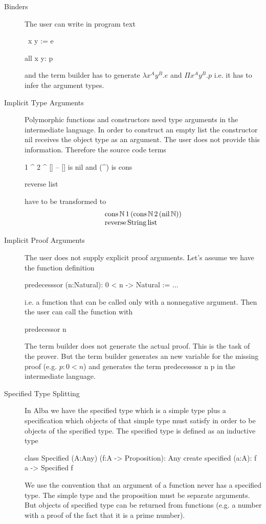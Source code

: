 \begin{description}

\item[Binders]
  The user can write in program text
  \begin{alba}
    \ x y := e

    all x y: p
  \end{alba}
  and the term builder has to generate $\lambda x^A y^B. e$ and $\Pi
  x^A y^B  . p$ i.e. it has to infer the argument types.


\item[Implicit Type Arguments]
  Polymorphic functions and constructors need type arguments in the
  intermediate language. In order to construct an empty list the constructor
  $\text{nil}$ receives the object type as an argument. The user does not
  provide this information. Therefore the source code terms
  \begin{alba}
    1 ^ 2 ^ []           -- [] is nil and (^) is cons

    reverse list
  \end{alba}
  have to be transformed to
  $$
  \begin{array}{l}
    \text{cons}\, \Natural\, 1 \,(\text{cons}\, \Natural\, 2\, (\text{nil}\,
    \Natural))

    \\

    \text{reverse}\, \text{String} \, \text{list}
  \end{array}
  $$


\item[Implicit Proof Arguments]
  The user does not supply explicit proof arguments. Let's assume we have the
  function definition
  \begin{alba}
    predecesssor (n:Natural): 0 < n -> Natural := ...
  \end{alba}
  i.e. a function that can be called only with a nonnegative argument. Then
  the user can call the function with
  \begin{alba}
    predecessor n
  \end{alba}
  The term builder does not generate the actual proof. This is the task of the
  prover. But the term builder generates an new variable for the missing proof
  (e.g. $p: 0 < n$) and generates the term $\text{predecesssor n p}$ in the
  intermediate language.


\item[Specified Type Splitting]
  In Alba we have the specified type which is a simple type plus a
  specification which objects of that simple type must satisfy in order to be
  objects of the specified type. The specified type is defined as an inductive
  type
  \begin{alba}
    class Specified (A:Any) (f:A -> Proposition): Any create
      specified (a:A): f a -> Specified f
  \end{alba}
  We use the convention that an argument of a function never has a specified
  type. The simple type and the proposition must be separate arguments. But
  objects of specified type can be returned from functions (e.g. a number with
  a proof of the fact that it is a prime number).


\end{description}
